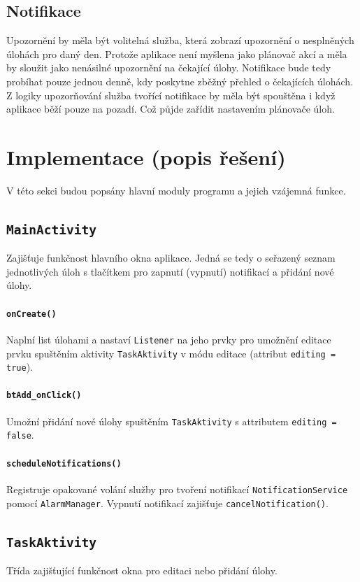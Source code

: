 \documentclass[12pt]{article}
\begin{document}
\subsection{Notifikace}
Upozornění by měla být volitelná služba, která zobrazí upozornění o nesplněných úlohách pro daný den. Protože aplikace není myšlena jako plánovač akcí a měla by sloužit jako nenásilné upozornění na čekající úlohy. Notifikace bude tedy probíhat pouze jednou denně, kdy poskytne zběžný přehled o čekajících úlohách. Z logiky upozorňování služba tvořící notifikace by měla být spouštěna i když aplikace běží pouze na pozadí. Což půjde zařídit nastavením plánovače úloh.

\pagebreak
\section{Implementace (popis řešení)}
V této sekci budou popsány hlavní moduly programu a jejich vzájemná funkce.

\subsection{\texttt{MainActivity}}
Zajišťuje funkčnost hlavního okna aplikace. Jedná se tedy o seřazený seznam jednotlivých úloh s tlačítkem pro zapnutí (vypnutí) notifikací a přidání nové úlohy.

\paragraph{\texttt{onCreate()}}
Naplní list úlohami a nastaví \texttt{Listener} na jeho prvky pro umožnění editace prvku spuštěním aktivity \texttt{TaskAktivity} v módu editace (attribut \texttt{editing = true}).

\paragraph{\texttt{btAdd\_onClick()}}
Umožní přidání nové úlohy spuštěním \texttt{TaskAktivity} s attributem \texttt{editing = false}.

\paragraph{\texttt{scheduleNotifications()}}
Registruje opakované volání služby pro tvoření notifikací \texttt{NotificationService} pomocí \texttt{AlarmManager}. Vypnutí notifikací zajišťuje \texttt{cancelNotification()}.

\subsection{\texttt{TaskAktivity}}
Třída zajišťující funkčnost okna pro editaci nebo přidání úlohy.
\end{document}

